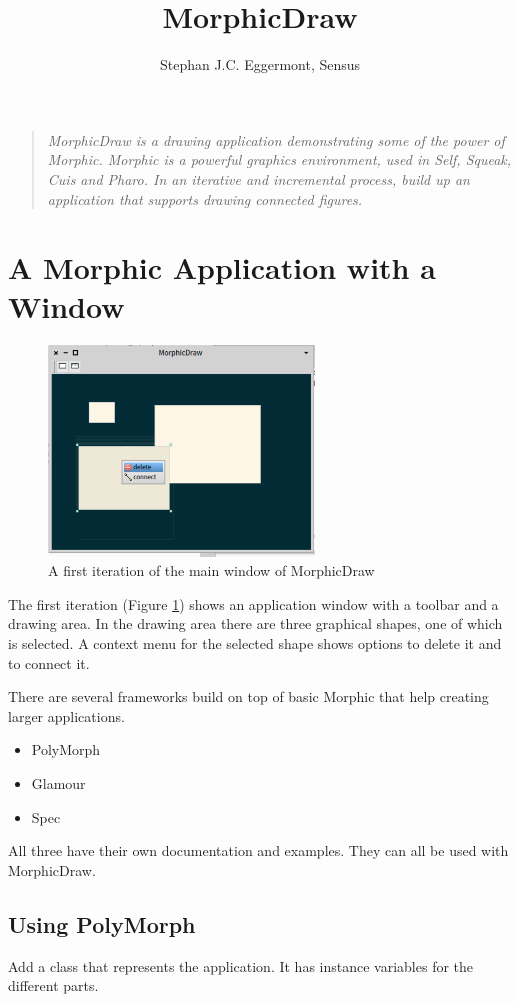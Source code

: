 \documentclass[10pt]{article}   	%
\title{MorphicDraw}
\author{Stephan J.C. Eggermont, Sensus}
\begin{document}
\setlength{\parindent}{0pt}
\maketitle
\begin{quote}
\em
MorphicDraw is a drawing application demonstrating some of the power of Morphic.
Morphic is a powerful graphics environment, used in Self, Squeak, Cuis and Pharo.
In an iterative and incremental process, build up an application that supports
drawing connected figures.
\end{quote} 
\section{A Morphic Application with a Window}
\begin{figure}[htb]
\begin{center}
\includegraphics[width=200pt]{SimpleMorphicDrawWindow.png}
\caption{A first iteration of the main window of MorphicDraw}
\label{1stIteration}
\end{center}
\end{figure}
The first iteration (Figure \ref{1stIteration})  shows an application window 
with a toolbar and a drawing area. In the drawing area there are 
three graphical shapes, one of which is selected. A context menu
for the selected shape shows options to delete it and to connect it.

There are several frameworks build on top of basic Morphic that
help creating larger applications.
\begin{itemize}
\item PolyMorph
\item Glamour
\item Spec
\end{itemize}
All three have their own documentation and examples. They can all 
be used with MorphicDraw.
\subsection{Using PolyMorph}
Add a class that represents the application. It has instance variables for 
the different parts. 
\end{document}
